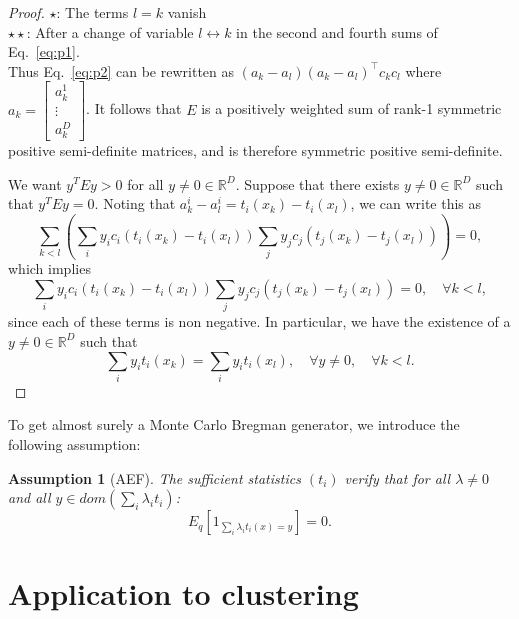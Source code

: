 \documentclass[graybox]{svmult}
\def\bbR{\mathbb{R}}
\newtheorem{assumption}{Assumption}
\begin{document}
\begin{proof}
$\star$: The terms $l=k$ vanish\\
$\star\star$: After a change of variable $l\leftrightarrow k$ in the second and fourth sums of Eq.~\ref{eq:p1}.\\

Thus Eq.~\ref{eq:p2} can be rewritten as $(a_k-a_l)(a_k-a_l)^\top c_k c_l$ 
where $a_k=\left[ \begin{array}{c}a_k^1\\ \vdots\\ a_k^D\end{array}\right]$.
It follows that $E$ is a positively weighted sum of rank-1 symmetric
positive semi-definite matrices, and is therefore symmetric positive
semi-definite.

We want $y^TEy > 0$ for all $y \neq 0 \in \bbR^D$. Suppose that there exists
$y \neq 0 \in \bbR^D$ such that $y^TEy = 0$. Noting that $a^i_k - a_l^i
= t_i(x_k) - t_i(x_l)$, we can write this as
\begin{equation}\label{eq:symdefcondition}
\sum_{k<l} \left( \sum_{i}y_ic_i(t_i(x_k) - t_i(x_l)) \sum_j y_jc_j(t_j(x_k)
  - t_j(x_l)) \right) = 0,
\end{equation}
which implies
\begin{equation}
  \label{eq:symdefcond2}
  \sum_{i}y_ic_i\left(t_i(x_k) - t_i(x_l)\right) \sum_j y_jc_j\left(t_j(x_k)
  - t_j(x_l)\right) = 0, \quad \forall k < l, 
\end{equation}
since each of these terms is non negative.
In particular, we have the existence of a $y \neq 0 \in \bbR^D$ such that
\begin{equation}\label{eq:symdefcond3}
 \sum_i y_i t_i(x_k) = \sum_i y_i t_i(x_l), \quad \forall y \neq 0, \quad
  \forall k < l.
\end{equation}

\end{proof}


To get  almost surely  a Monte Carlo Bregman generator, we
introduce the following assumption:
\begin{assumption}[AEF]
  The sufficient statistics $\left(t_i\right)$ verify that for all
  $\lambda \neq 0$ and all $y \in dom(\sum_i \lambda_i t_i)$:
  \[ E_q \left[ 1_{\sum_i \lambda_i t_i(x) = y} \right] = 0. \]
\end{assumption}



\section{Application to clustering}\label{sec:MCIGClust}
\end{document}
